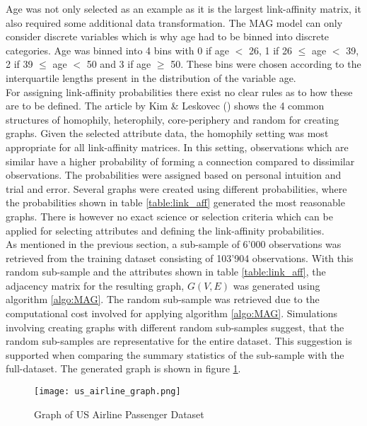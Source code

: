   \noindent Age was not only selected as an example as it is the largest
  link-affinity matrix, it also required some additional data transformation.
  The MAG model can only consider discrete variables which is why age had to be
  binned into discrete categories. Age was binned into 4 bins with 0 if age $<$ 
  26, 1 if 26 $\leqslant$ age $<$ 39, 2 if 39 $\leqslant$ age $<$ 50 and 3 if age
  $\geqslant$ 50. These bins were chosen according to the interquartile lengths 
  present in the distribution of the variable age. \\

  \noindent For assigning link-affinity probabilities there exist no clear rules 
  as to how these are to be defined. The article by Kim \& Leskovec 
  (\citeyear[p. 118]{kim2012multiplicative}) shows the 4 common structures of 
  homophily, heterophily, core-periphery and random for creating graphs. Given 
  the selected attribute data, the homophily setting was most appropriate for 
  all link-affinity matrices. In this setting, observations which are similar 
  have a higher probability of forming a connection compared to dissimilar 
  observations. The probabilities were assigned based on personal intuition and 
  trial and error. Several graphs were created using different probabilities, 
  where the probabilities shown in table \ref{table:link_aff} generated the most 
  reasonable graphs. There is however no exact science or selection criteria 
  which can be applied for selecting attributes and defining the link-affinity 
  probabilities. \\

  \noindent As mentioned in the previous section, a sub-sample of 6'000 
  observations was retrieved from the training dataset consisting of 103’904 
  observations. With this random sub-sample and the attributes shown in table
  \ref{table:link_aff}, the adjacency matrix for the 
  resulting graph, $G(V,E)$ was generated using algorithm \ref{algo:MAG}. The 
  random sub-sample was retrieved due to the computational cost involved for 
  applying algorithm \ref{algo:MAG}. Simulations involving creating graphs with 
  different random sub-samples suggest, that the random sub-samples are 
  representative for the entire dataset. This suggestion is supported when
  comparing the summary statistics of the sub-sample with the full-dataset. The
  generated graph is shown in figure \ref{fig:us_airline_graph}.

  \begin{figure}[h]
	  \centering
	  \texttt{[image: us\_airline\_graph.png]}
	  \caption{Graph of US Airline Passenger Dataset}
      \label{fig:us_airline_graph}
  \end{figure}
  
